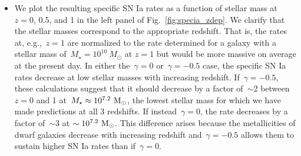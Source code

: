 \documentclass[ms.tex]{subfiles}
\begin{document}
\begin{itemize}
	\item We plot the resulting specific SN Ia rates as a function of stellar
	mass at~$z = 0$, 0.5, and 1 in the left panel of Fig.~\ref{fig:specia_zdep}.
	We clarify that the stellar masses correspond to the appropriate redshift.
	That is, the rates at, e.g.,~$z = 1$ are normalized to the rate determined
	for a galaxy with a stellar mass of~$M_\star = 10^{10}~M_\odot$ at $z = 1$
	but would be more massive on average at the present day.
	In either the~$\gamma = 0$ or~$\gamma = -0.5$ case, the specific SN Ia
	rates decrease at low stellar masses with increasing redshift.
	If~$\gamma = -0.5$, these calculations suggest that it should decrease by a
	factor of~$\sim$2 between~$z = 0$ and 1 at~$M_\star \approx 10^{7.2}~\text{M}_\odot$,
	the lowest stellar mass for which we have made predictions at all 3
	redshifts.
	If instead~$\gamma = 0$, the rate decreases by a factor of~$\sim$3 at
	$\sim10^{7.2}~\text{M}_\odot$.
	This difference arises because the metallicities of dwarf galaxies decrease
	with increasing redshift and~$\gamma = -0.5$ allows them to sustain higher
	SN Ia rates than if~$\gamma = 0$.


\end{itemize}
\end{document}
